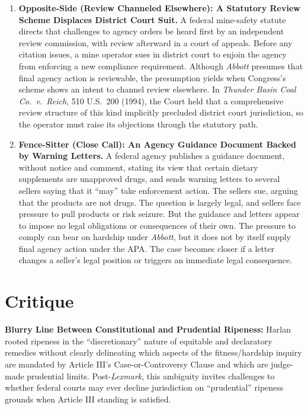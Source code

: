 \documentclass[12pt]{article}
\begin{document}
\begin{enumerate}
\item \textbf{Opposite-Side (Review Channeled Elsewhere): A Statutory Review Scheme Displaces District Court Suit.} A federal mine-safety statute directs that challenges to agency orders be heard first by an independent review commission, with review afterward in a court of appeals. Before any citation issues, a mine operator sues in district court to enjoin the agency from enforcing a new compliance requirement. Although \textit{Abbott} presumes that final agency action is reviewable, the presumption yields when Congress's scheme shows an intent to channel review elsewhere. In \textit{Thunder Basin Coal Co.\ v.\ Reich}, 510 U.S.\ 200 (1994), the Court held that a comprehensive review structure of this kind implicitly precluded district court jurisdiction, so the operator must raise its objections through the statutory path.

\item \textbf{Fence-Sitter (Close Call): An Agency Guidance Document Backed by Warning Letters.} A federal agency publishes a guidance document, without notice and comment, stating its view that certain dietary supplements are unapproved drugs, and sends warning letters to several sellers saying that it ``may'' take enforcement action. The sellers sue, arguing that the products are not drugs. The question is largely legal, and sellers face pressure to pull products or risk seizure. But the guidance and letters appear to impose no legal obligations or consequences of their own. The pressure to comply can bear on hardship under \textit{Abbott}, but it does not by itself supply final agency action under the APA. The case becomes closer if a letter changes a seller's legal position or triggers an immediate legal consequence.

\end{enumerate}

\section{Critique}
\textbf{Blurry Line Between Constitutional and Prudential Ripeness:} Harlan rooted ripeness in the ``discretionary'' nature of equitable and declaratory remedies without clearly delineating which aspects of the fitness/hardship inquiry are mandated by Article III's Case-or-Controversy Clause and which are judge-made prudential limits. Post-\textit{Lexmark}, this ambiguity invites challenges to whether federal courts may ever decline jurisdiction on ``prudential'' ripeness grounds when Article III standing is satisfied.
\end{document}
